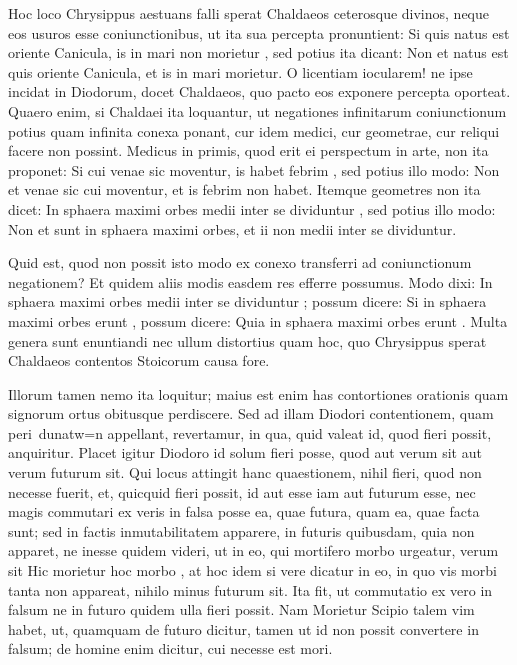  Hoc loco Chrysippus aestuans falli sperat Chaldaeos ceterosque divinos, neque eos usuros esse coniunctionibus, ut ita sua percepta pronuntient: Si quis natus est oriente Canicula, is in mari non morietur , sed potius ita dicant: Non et natus est quis oriente Canicula, et is in mari morietur. O licentiam iocularem! ne ipse incidat in Diodorum, docet Chaldaeos, quo pacto eos exponere percepta oporteat. Quaero enim, si Chaldaei ita loquantur, ut negationes infinitarum coniunctionum potius quam infinita conexa ponant, cur idem medici, cur geometrae, cur reliqui facere non possint. Medicus in primis, quod erit ei perspectum in arte, non ita proponet: Si cui venae sic moventur, is habet febrim , sed potius illo modo: Non et venae sic cui moventur, et is febrim non habet. Itemque geometres non ita dicet: In sphaera maximi orbes medii inter se dividuntur , sed potius illo modo: Non et sunt in sphaera maximi orbes, et ii non medii inter se dividuntur.

 Quid est, quod non possit isto modo ex conexo transferri ad coniunctionum negationem? Et quidem aliis modis easdem res efferre possumus. Modo dixi: In sphaera maximi orbes medii inter se dividuntur ; possum dicere: Si in sphaera maximi orbes erunt , possum dicere: Quia in sphaera maximi orbes erunt . Multa genera sunt enuntiandi nec ullum distortius quam hoc, quo Chrysippus sperat Chaldaeos contentos Stoicorum causa fore.

 Illorum tamen nemo ita loquitur; maius est enim has contortiones orationis quam signorum ortus obitusque perdiscere. Sed ad illam Diodori contentionem, quam peri\ dunatw=n appellant, revertamur, in qua, quid valeat id, quod fieri possit, anquiritur. Placet igitur Diodoro id solum fieri posse, quod aut verum sit aut verum futurum sit. Qui locus attingit hanc quaestionem, nihil fieri, quod non necesse fuerit, et, quicquid fieri possit, id aut esse iam aut futurum esse, nec magis commutari ex veris in falsa posse ea, quae futura, quam ea, quae facta sunt; sed in factis inmutabilitatem apparere, in futuris quibusdam, quia non apparet, ne inesse quidem videri, ut in eo, qui mortifero morbo urgeatur, verum sit Hic morietur hoc morbo , at hoc idem si vere dicatur in eo, in quo vis morbi tanta non appareat, nihilo minus futurum sit. Ita fit, ut commutatio ex vero in falsum ne in futuro quidem ulla fieri possit. Nam Morietur Scipio talem vim habet, ut, quamquam de futuro dicitur, tamen ut id non possit convertere in falsum; de homine enim dicitur, cui necesse est mori.

